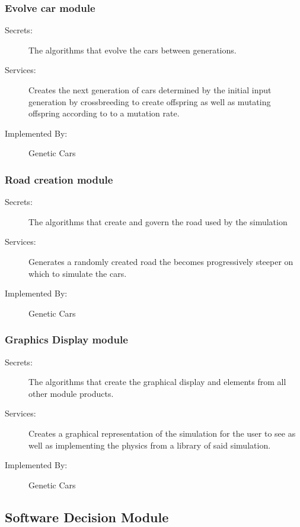 \documentclass[12pt, titlepage]{article}
\begin{document}
\subsubsection{Evolve car module}

\begin{description}
\item[Secrets:] The algorithms that evolve the cars between generations.
\item[Services:] Creates the next generation of cars determined by the initial 
input generation by crossbreeding to create offspring as well as mutating 
offspring according to to a mutation rate.
\item[Implemented By:] Genetic Cars
\end{description}

\subsubsection{Road creation module}

\begin{description}
\item[Secrets:] The algorithms that create and govern the road used by the 
simulation
\item[Services:] Generates a randomly created road the becomes progressively 
steeper on which to simulate the cars.
\item[Implemented By:] Genetic Cars
\end{description}

\subsubsection{Graphics Display module}

\begin{description}
\item[Secrets:] The algorithms that create the graphical display and elements 
from all other module products.
\item[Services:] Creates a graphical representation of the simulation for the 
user to see as well as implementing the physics from a library of said 
simulation.
\item[Implemented By:] Genetic Cars
\end{description}

\subsection{Software Decision Module}
\end{document}
